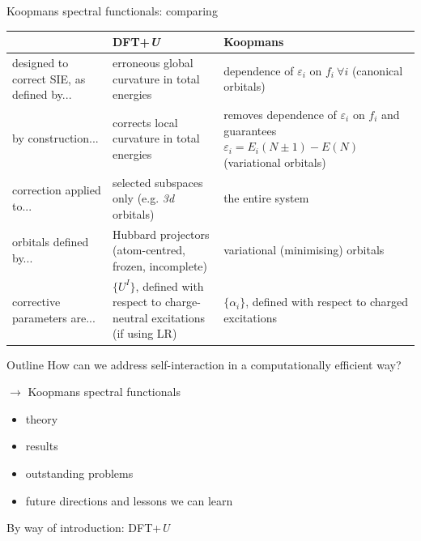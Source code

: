 \documentclass[xcolor=table,aspectratio=169]{beamer}
\numberwithin{equation}{section}
\begin{document}
\begin{frame}{Koopmans spectral functionals: comparing}
   \small
   \renewcommand{\arraystretch}{1.5}
   \begin{tabularx}{\columnwidth}{L L L}
                                                & \textbf{DFT+\emph{U}}                                                       & \textbf{Koopmans}                                                                                                         \\
      \hline
      designed to correct SIE, as defined by... & erroneous global curvature in total energies                                & dependence of $\varepsilon_i$ on $f_i \ \forall i$ (canonical orbitals)                                                   \\
      by construction...                        & corrects local curvature in total energies                                  & removes dependence of $\varepsilon_i$ on $f_i$ and guarantees $\varepsilon_i = E_i(N\pm 1) - E(N)$ (variational orbitals) \\
      correction applied to...                  & selected subspaces only (e.g. \emph{3d} orbitals)                           & the entire system                                                                                                         \\
      orbitals defined by...                    & Hubbard projectors (atom-centred, frozen, incomplete)                       & variational (minimising) orbitals                                                                                         \\
      corrective parameters are...              & $\{U^I\}$, defined with respect to charge-neutral excitations (if using LR) & $\{\alpha_i\}$, defined with respect to charged excitations                                                               \\
   \end{tabularx}
\end{frame}

\begin{frame}{Outline}
   How can we address self-interaction in a computationally efficient way?

   $\longrightarrow$ Koopmans spectral functionals

   \begin{itemize}
      \item theory
      \item results
      \item outstanding problems
      \item future directions and lessons we can learn
   \end{itemize}

   By way of introduction: DFT+\emph{U}

\end{frame}
\end{document}
